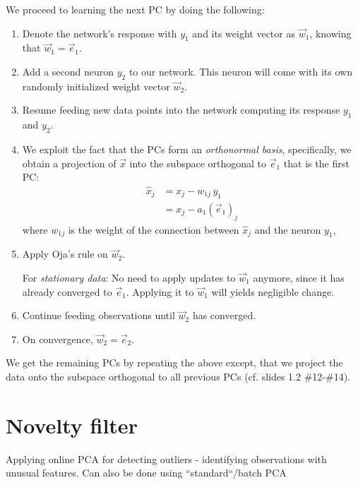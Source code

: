 We proceed to learning the next PC by doing the following:
\begin{enumerate}
\item Denote the network's response with $y_1$ and its weight vector as $\vec w_1$, knowing that $\vec w_1 = \vec e_1$.
\item Add a second neuron $y_2$ to our network. This neuron will come with its own randomly initialized weight vector $\vec w_2$.
\item Resume feeding new data points into the network computing its response $y_1$ and $y_2$.
\item We exploit the fact that the PCs form an \emph{orthonormal basis}, specifically, we obtain a projection of $\vec x$ 
into the subspace orthogonal to $\vec e_1$ that is the first PC:
\begin{align*}
\hat x_j &= x_j - w_{1j} \, y_1 \\
         &= x_j - a_1 (\vec e_1)_j
\end{align*}
where $w_{1j}$ is the weight of the connection between $\hat x_j$ and the neuron $y_1$,
\item Apply Oja's rule on $\vec w_2$.

For \emph{stationary data}: No need to apply updates to $\vec w_1$ anymore, since it has already converged to $\vec e_1$. Applying it to $\vec w_1$ will yields negligible change.
 
\item Continue feeding observations until $\vec w_2$ has converged.
\item On convergence, $\vec w_2 = \vec e_2$.
\end{enumerate}

We get the remaining PCs by repeating the above except, that we project 
the data onto the subspace orthogonal to all previous PCs (cf. slides 1.2 \#12-\#14).

\newpage

\section{Novelty filter}

Applying online PCA for detecting outliers - identifying observations with unusual features. 
Can also be done using ``standard``/batch PCA



